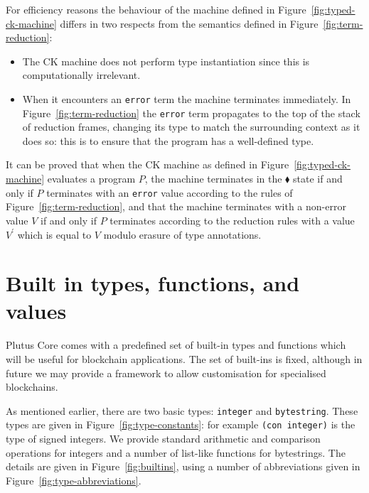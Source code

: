 \documentclass[a4paper]{article}
\begin{document}
For efficiency reasons the behaviour of the machine defined in
Figure~\ref{fig:typed-ck-machine} differs in two respects from the semantics
defined in Figure~\ref{fig:term-reduction}:
\begin{itemize}
\item The CK machine does not perform type instantiation since this
  is computationally irrelevant.
\item When it encounters an \texttt{error} term the machine terminates
  immediately.  In Figure~\ref{fig:term-reduction} the \texttt{error}
  term propagates to the top of the stack of reduction frames,
  changing its type to match the surrounding context as it does so:
  this is to ensure that the program has a well-defined type.
\end{itemize}
\noindent It can be proved that when the CK machine as defined in
Figure~\ref{fig:typed-ck-machine} evaluates a program $P$, the machine
terminates in the $\blacklozenge$ state if and only if $P$ terminates
with an \texttt{error} value according to the rules of
Figure~\ref{fig:term-reduction}, and that the machine terminates with
a non-error value $V$ if and only if $P$ terminates according to the
reduction rules with a value $V^{\prime}$ which is equal to $V$
modulo erasure of type annotations.


\section{Built in types, functions, and values}
\label{sec:builtins}
Plutus Core comes with a predefined set of built-in types and
functions which will be useful for blockchain applications.  The set
of built-ins is fixed, although in future we may provide a framework
to allow customisation for specialised blockchains.

As mentioned earlier, there are two basic types: \texttt{integer} and
\texttt{bytestring}.  These types are given in
Figure~\ref{fig:type-constants}: for example \texttt{(con
  integer)} is the type of signed integers.
We provide standard arithmetic and comparison operations for integers
and a number of list-like functions for bytestrings. The details are
given in Figure~\ref{fig:builtins}, using a number of
abbreviations given in Figure~\ref{fig:type-abbreviations}.
\end{document}
